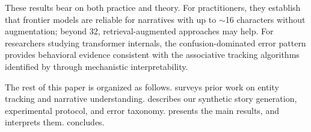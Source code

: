 These results bear on both practice and theory.
For practitioners, they establish that frontier models are reliable for narratives with up to $\sim$16 characters without augmentation; beyond 32, retrieval-augmented approaches may help.
For researchers studying transformer internals, the confusion-dominated error pattern provides behavioral evidence consistent with the associative tracking algorithms identified by \citet{li2025state} through mechanistic interpretability.

The rest of this paper is organized as follows.
 surveys prior work on entity tracking and narrative understanding.
 describes our synthetic story generation, experimental protocol, and error taxonomy.
 presents the main results, and  interprets them.
 concludes.
